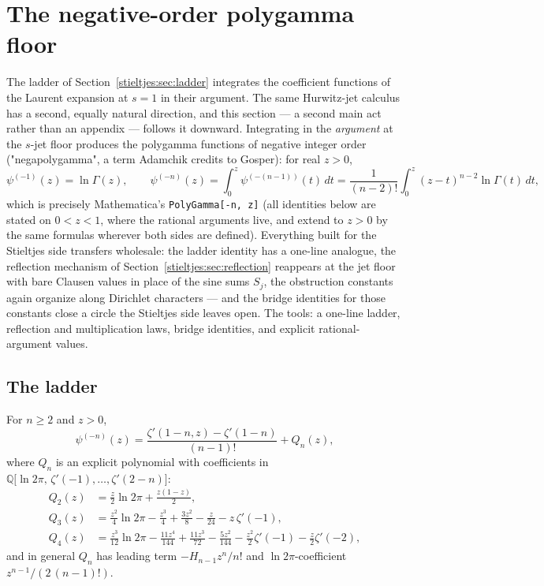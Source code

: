 \section{The negative-order polygamma floor}\label{stieltjes:sec:negapoly}

The ladder of Section~\ref{stieltjes:sec:ladder} integrates the coefficient functions of the Laurent expansion at $s=1$ in their argument. The same Hurwitz-jet calculus has a second, equally
natural direction, and this section — a second main act rather than an
appendix — follows it downward. Integrating in the \emph{argument} at the
$s$-jet floor produces the polygamma functions of negative integer order
("negapolygamma", a term Adamchik \cite{stieltjes:Adamchik98} credits to Gosper):
for real $z>0$,
\[
\psi^{(-1)}(z)=\ln\Gamma(z),\qquad
\psi^{(-n)}(z)=\int_0^z\psi^{(-(n-1))}(t)\,dt
=\frac{1}{(n-2)!}\int_0^z(z-t)^{n-2}\ln\Gamma(t)\,dt ,
\]
which is precisely Mathematica's \texttt{PolyGamma[-n,\,z]} (all
identities below are stated on $0<z<1$, where the rational arguments
live, and extend to $z>0$ by the same formulas wherever both sides are
defined). Everything built for the Stieltjes side transfers wholesale:
the ladder identity has a one-line analogue, the reflection mechanism of
Section~\ref{stieltjes:sec:reflection} reappears at the jet floor with bare Clausen
values in place of the sine sums $S_j$, the obstruction constants again
organize along Dirichlet characters — and the bridge identities for those
constants close a circle the Stieltjes side leaves open. The tools:
a one-line ladder, reflection and multiplication laws, bridge identities,
and explicit rational-argument values.

\subsection{The ladder}

\begin{theorem}\label{stieltjes:thm:negladder}
For $n\ge2$ and $z>0$,
\[
\psi^{(-n)}(z)=\frac{\zeta'(1-n,z)-\zeta'(1-n)}{(n-1)!}+Q_n(z),
\]
where $Q_n$ is an explicit polynomial with coefficients in
$\mathbb{Q}\bigl[\ln 2\pi,\,\zeta'(-1),\dots,\zeta'(2-n)\bigr]$:
\begin{align*}
Q_2(z)&=\tfrac{z}{2}\ln2\pi+\tfrac{z(1-z)}{2},\\
Q_3(z)&=\tfrac{z^2}{4}\ln2\pi-\tfrac{z^3}{4}+\tfrac{3z^2}{8}-\tfrac{z}{24}
-z\,\zeta'(-1),\\
Q_4(z)&=\tfrac{z^3}{12}\ln2\pi-\tfrac{11z^4}{144}+\tfrac{11z^3}{72}
-\tfrac{5z^2}{144}-\tfrac{z^2}{2}\zeta'(-1)-\tfrac{z}{2}\zeta'(-2),
\end{align*}
and in general $Q_n$ has leading term $-H_{n-1}z^n/n!$ and
$\ln2\pi$-coefficient $z^{n-1}/(2\,(n-1)!)$.
\end{theorem}

